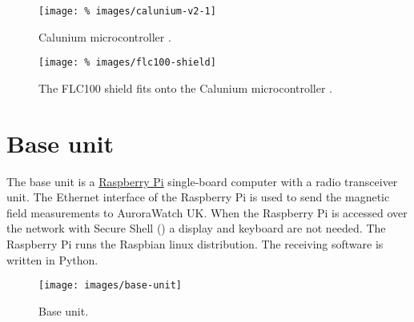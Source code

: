 \begin{figure}
  \centering
  \texttt{[image: \%
    images/calunium-v2-1]}
  \caption[Calunium microcontroller PCB]{%
    Calunium microcontroller \pcb. %
    }
  \label{fig:calunium}
\end{figure}

\begin{figure}
  \centering
  \texttt{[image: \%
    images/flc100-shield]}
  \caption[FLC100 shield]{The FLC100 shield fits onto the Calunium
    microcontroller \pcb. }
  \label{fig:flc-100-shield}
\end{figure}

\clearpage
\section{Base unit}

The base unit is a \href{http://www.raspberrypi.org/‎}{Raspberry Pi}
single-board computer with a radio transceiver unit. The Ethernet
interface of the Raspberry Pi is used to send the magnetic field
measurements to AuroraWatch UK. When the Raspberry Pi is accessed over
the network with Secure Shell (\ssh) a display and keyboard are not
needed. The Raspberry Pi runs the Raspbian linux distribution. The
receiving software is written in Python.

\begin{figure}[!h]
  \centering
  \texttt{[image: images/base-unit]}
  \caption[Base unit]{%
    Base unit. }
  \label{fig:base-unit}
\end{figure}
